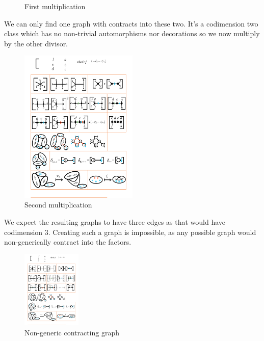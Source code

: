 \documentclass[12pt]{memoir}
\begin{document}
\begin{Ex}
\begin{figure}[h!]
        \caption{First multiplication}
        \label{fig:three-divisors-2-M06}
    \end{figure}
    We can only find one graph with contracts into these two. It's a codimension two class which has no non-trivial automorphisms nor decorations so we now multiply by the other divisor.
     \begin{figure}[h!]
        \centering
        \includegraphics[width=0.5\textwidth, trim= 1.3cm 13.4cm 12.8cm 11.7cm,clip]{../figs/FigsDNnotability1.pdf}
        \caption{Second multiplication}
        \label{fig:three-divisors-3-M06}
    \end{figure}

    We expect the resulting graphs to have three edges as that would have codimension $3$. Creating such a graph is impossible, as any possible graph would non-generically contract into the factors.

      \begin{figure}[h!]
        \centering
        \includegraphics[width=0.25\textwidth, trim= 16.6cm 13.4cm 1.3cm 11.7cm,clip]{../figs/FigsDNnotability1.pdf}
        \caption{Non-generic contracting graph}
        \label{fig:three-divisors-4-M06}
    \end{figure}
    

\end{Ex}
\end{document}

